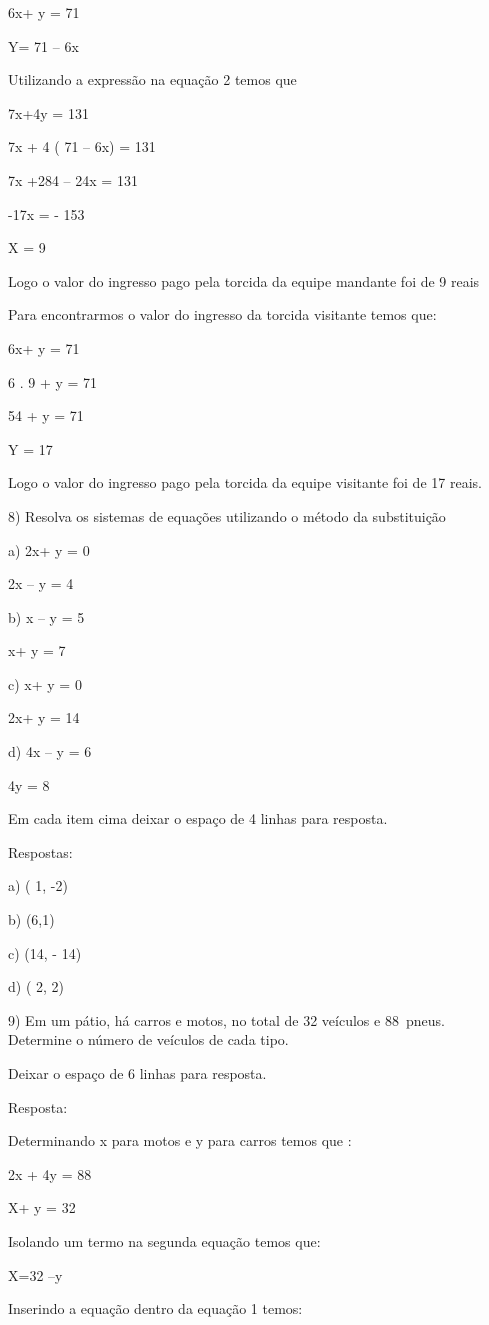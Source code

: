 {6x+ y = 71

Y= 71 -- 6x

Utilizando a expressão na equação 2 temos que

7x+4y = 131

7x + 4 ( 71 -- 6x) = 131

7x +284 -- 24x = 131

-17x = - 153

X = 9

Logo o valor do ingresso pago pela torcida da equipe mandante foi de 9
reais

Para encontrarmos o valor do ingresso da torcida visitante temos que:

6x+ y = 71

6 . 9 + y = 71

54 + y = 71

Y = 17

Logo o valor do ingresso pago pela torcida da equipe visitante foi de 17
reais.

8) Resolva os sistemas de equações utilizando o método da substituição

a) 2x+ y = 0

2x -- y = 4

b) x -- y = 5

x+ y = 7

c) x+ y = 0

2x+ y = 14

d) 4x -- y = 6

4y = 8

Em cada item cima deixar o espaço de 4 linhas para resposta.

Respostas:

a) ( 1, -2)

b) (6,1)

c) (14, - 14)

d) ( 2, 2)

9) Em um pátio, há carros e motos, no total de 32 veículos e 88~pneus.
Determine o número de veículos de cada tipo.

Deixar o espaço de 6 linhas para resposta.

Resposta:

Determinando x para motos e y para carros temos que :

2x + 4y = 88

X+ y = 32

Isolando um termo na segunda equação temos que:

X=32 --y

Inserindo a equação dentro da equação 1 temos:

}
